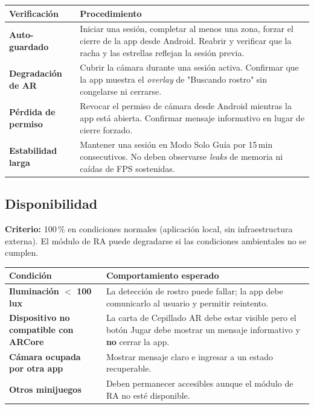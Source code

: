 \documentclass[12pt, a4paper]{article}
\begin{document}
\begin{table}[H]
  \centering
  \renewcommand{\arraystretch}{1.3}
  \begin{tabular}{>{\bfseries}p{4cm} p{8cm}}
    \toprule
    Verificación & Procedimiento \\
    \midrule
    Auto-guardado & Iniciar una sesión, completar al menos una zona, forzar
                    el cierre de la app desde Android. Reabrir y verificar
                    que la racha y las estrellas reflejan la sesión previa. \\
    Degradación de AR & Cubrir la cámara durante una sesión activa.
                        Confirmar que la app muestra el \textit{overlay}
                        de "Buscando rostro" sin congelarse ni cerrarse. \\
    Pérdida de permiso & Revocar el permiso de cámara desde Android mientras
                         la app está abierta. Confirmar mensaje informativo
                         en lugar de cierre forzado. \\
    Estabilidad larga & Mantener una sesión en Modo Solo Guía por 15\,min
                        consecutivos. No deben observarse \textit{leaks} de
                        memoria ni caídas de FPS sostenidas. \\
    \bottomrule
  \end{tabular}
\end{table}

\subsection{Disponibilidad}

\textbf{Criterio:} 100\,\% en condiciones normales (aplicación local, sin
infraestructura externa). El módulo de RA puede degradarse si las condiciones
ambientales no se cumplen.

\begin{table}[H]
  \centering
  \renewcommand{\arraystretch}{1.3}
  \begin{tabular}{>{\bfseries}p{4cm} p{8cm}}
    \toprule
    Condición & Comportamiento esperado \\
    \midrule
    Iluminación $<$ 100\,lux & La detección de rostro puede fallar; la app debe
                               comunicarlo al usuario y permitir reintento. \\
    Dispositivo no compatible con ARCore & La carta de Cepillado AR debe estar
                                          visible pero el botón Jugar debe mostrar
                                          un mensaje informativo y \textbf{no}
                                          cerrar la app. \\
    Cámara ocupada por otra app & Mostrar mensaje claro e ingresar a un estado
                                   recuperable. \\
    Otros minijuegos & Deben permanecer accesibles aunque el módulo de RA no
                      esté disponible. \\
    \bottomrule
  \end{tabular}
\end{table}
\end{document}
